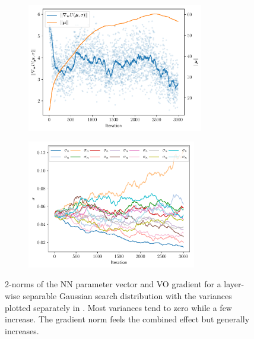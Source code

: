 \begin{figure}[tbp!]
    \begin{subfigure}[b]{0.49\textwidth}
        \centering
        \includegraphics[height=5.6cm]{graphics/E031-NORM-analysis/separable-layer-5-param-and-grad-norm.pdf}
        \caption{}
        \label{fig: Theory: E031-NORM-analysis/separable-layer-5-param-and-grad-norm}
    \end{subfigure}
    \hfill
    \begin{subfigure}[b]{0.49\textwidth}
        \centering
        \includegraphics[height=5.6cm]{graphics/E031-NORM-analysis/separable-layer-5-variance.pdf}
        \caption{}
        \label{fig: Theory: E031-NORM-analysis/separable-layer-5-variance}
    \end{subfigure}
    \caption{
         2-norms of the \gls{NN} parameter vector and \gls{VO} gradient for a layer-wise separable Gaussian search distribution with the variances plotted separately in . Most variances tend to zero while a few increase. The gradient norm feels the combined effect but generally increases.
    }
    \label{fig: Theory: E031-NORM-analysis-layer-separable}
\end{figure}
